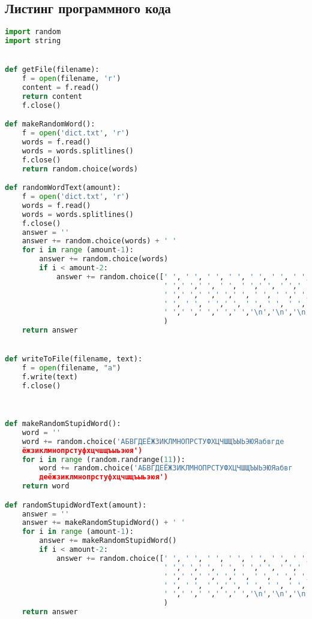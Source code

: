 \documentclass[12pt]{article}
\begin{document}
\subsection*{Листинг программного кода}
\begin{lstlisting}[language=Python]
import random
import string


def getFile(filename):
    f = open(filename, 'r')
    content = f.read()
    return content
    f.close()

def makeRandomWord():
    f = open('dict.txt', 'r')
    words = f.read()
    words = words.splitlines()
    f.close()
    return random.choice(words)

def randomWordText(amount):
    f = open('dict.txt', 'r')
    words = f.read()
    words = words.splitlines()
    f.close()
    answer = ''
    answer += random.choice(words) + ' '
    for i in range (amount-1):
        answer += random.choice(words)
        if i < amount-2:
            answer += random.choice([' ', ' ', ' ', ' ', ' ', ' ', ' ', ' ',' ',
                                     ' ',' ',' ', ' ', ' ',' ', ' ',' ',' ',' ',
                                     ' ',' ',' ',' ',' ', ' ', ' ',' ', ' ',' ',
                                     ' ', ' ', ' ',' ', ' ', ' ', ' ', ' ', ' ',
                                     ' ',' ',' ',' ',' ','\n','\n','\n','\n\n']
                                     )
    return answer


def writeToFile(filename, text):
    f = open(filename, "a")
    f.write(text)
    f.close()
    


def makeRandomStupidWord():
    word = ''
    word += random.choice('АБВГДЕЁЖЗИКЛМНОПРСТУФХЦЧШЩЪЫЬЭЮЯабвгде
    ёжзиклмнопрстуфхцчшщъыьэюя')
    for i in range (random.randrange(11)):
        word += random.choice('АБВГДЕЁЖЗИКЛМНОПРСТУФХЦЧШЩЪЫЬЭЮЯабвг
        деёжзиклмнопрстуфхцчшщъыьэюя')
    return word

def randomStupidWordText(amount):
    answer = ''
    answer += makeRandomStupidWord() + ' '
    for i in range (amount-1):
        answer += makeRandomStupidWord()
        if i < amount-2:
            answer += random.choice([' ', ' ', ' ', ' ', ' ', ' ', ' ', ' ',' ',
                                     ' ',' ',' ', ' ', ' ',' ', ' ',' ',' ',' ',
                                     ' ',' ',' ',' ',' ', ' ', ' ',' ', ' ',' ',
                                     ' ', ' ', ' ',' ', ' ', ' ', ' ', ' ', ' ',
                                     ' ',' ',' ',' ',' ','\n','\n','\n','\n\n']
                                     )
    return answer


\end{lstlisting}
\end{document}
